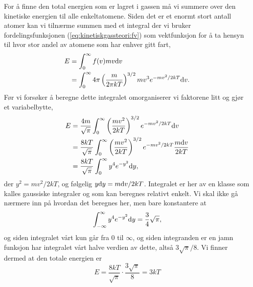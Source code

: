 For å finne den total energien som er lagret i gassen må vi summere over den kinetiske energien til alle enkeltatomene. Siden det er et enormt stort antall atomer kan vi tilnærme summen med et integral der vi bruker fordelingsfunksjonen (\ref{eq:kinetiskgassteori:fv}) som vektfunksjon for å ta hensyn til hvor stor andel av atomene som har enhver gitt fart,
\begin{displaymath}
\begin{aligned}
	E &= \int_0^\infty f(v)mv\text{d} v \\
	&= \int_0^\infty 4\pi\left(\frac{m}{2\pi kT}\right)^{3/2} mv^3 e^{-mv^2/2kT} \text{d} v.
\end{aligned}
\end{displaymath}
Før vi forsøker å beregne dette integralet omorganiserer vi faktorene litt og gjør et variabelbytte,
\begin{displaymath}
\begin{aligned}
	E &= \frac{4 m}{\sqrt{\pi}} \int_0^\infty \left(\frac{mv^2}{2kT}\right)^{3/2} e^{-mv^2/2kT} \text{d} v \\
	&= \frac{8 kT}{\sqrt{\pi}} \int_0^\infty \left(\frac{mv^2}{2kT}\right)^{3/2} e^{-mv^2/2kT} \frac{m \text{d} v}{2kT} \\
	& = \frac{8kT}{\sqrt{\pi}} \int_0^\infty y^4 e^{-y^2} \text{d} y,
\end{aligned}
\end{displaymath}
der $y^2 = mv^2/2kT$, og følgelig $y\text{d} y = m\text{d} v/2kT$. Integralet er her av en klasse som kalles gaussiske integraler og som kan beregnes relativt enkelt. Vi skal ikke gå nærmere inn på hvordan det beregnes her, men bare konstantere at
\begin{displaymath}
	\int_{-\infty}^\infty y^4e^{-y^2} \text{d} y = \frac{3}{4}\sqrt{\pi},
\end{displaymath}
og siden integralet vårt kun går fra $0$ til $\infty$, og siden integranden er en jamn funksjon har integralet vårt halve verdien av dette, altså $3\sqrt{\pi}/8$. Vi finner dermed at den totale energien er 
\begin{displaymath}
	E = \frac{8kT}{\sqrt{\pi}}\cdot \frac{3\sqrt{\pi}}{8} = 3kT
\end{displaymath}



